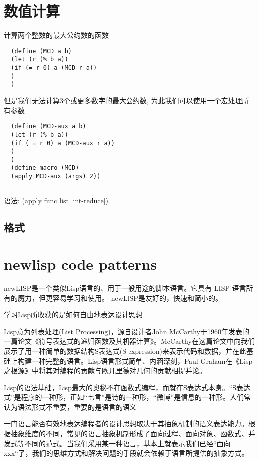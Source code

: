 \documentclass[cn,11pt]{elegantbook}
\begin{document}
\section{数值计算}

计算两个整数的最大公约数的函数
\begin{lstlisting}
  (define (MCD a b)
  (let (r (% b a))
  (if (= r 0) a (MCD r a))
  )
  )
\end{lstlisting}

但是我们无法计算3个或更多数字的最大公约数,
为此我们可以使用一个宏处理所有参数

\begin{lstlisting}
  (define (MCD-aux a b)
  (let (r (% b a))
  (if ( = r 0) a (MCD-aux r a))
  )
  )
  (define-macro (MCD)
  (apply MCD-aux (args) 2))
  
\end{lstlisting}

语法: (apply func list [int-reduce])

\subsection{格式}
 
\section{newlisp code patterns}


newLISP是一个类似Lisp语言的、用于一般用途的脚本语言。它具有 LISP 语言所有的魔力，但更容易学习和使用。 newLISP是友好的，快速和简小的。

学习Lisp所收获的是如何自由地表达设计思想

Lisp意为列表处理(List Processing)，源自设计者John McCarthy于1960年发表的一篇论文《符号表达式的递归函数及其机器计算》。McCarthy在这篇论文中向我们展示了用一种简单的数据结构S表达式(S-expression)来表示代码和数据，并在此基础上构建一种完整的语言。Lisp语言形式简单、内涵深刻，Paul Graham在《Lisp之根源》中将其对编程的贡献与欧几里德对几何的贡献相提并论。

Lisp的语法基础，Lisp最大的奥秘不在函数式编程，而就在S表达式本身。“S表达式”是程序的一种形，正如“七言”是诗的一种形，“微博”是信息的一种形。人们常认为语法形式不重要，重要的是语言的语义

一门语言能否有效地表达编程者的设计思想取决于其抽象机制的语义表达能力。根据抽象维度的不同，常见的语言抽象机制形成了面向过程、面向对象、函数式、并发式等不同的范式。当我们采用某一种语言，基本上就表示我们已经“面向xxx“了，我们的思维方式和解决问题的手段就会依赖于语言所提供的抽象方式。
\end{document}
